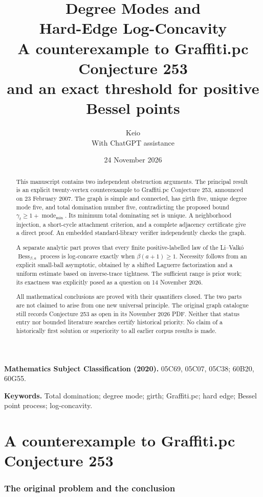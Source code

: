 \documentclass[11pt,a4paper]{article}
\title{\color{ink}\bfseries Degree Modes and\\
Hard-Edge Log-Concavity\\[6pt]
\large A counterexample to Graffiti.pc Conjecture 253\\
and an exact threshold for positive Bessel points}
\author{Keio\\[2pt]\small With ChatGPT assistance}
\date{24 November 2026}
\theoremstyle{definition}
\theoremstyle{remark}
\begin{document}
\maketitle
\thispagestyle{plain}

\begin{abstract}
This manuscript contains two independent obstruction arguments.
The principal result is an explicit twenty-vertex counterexample to
Graffiti.pc Conjecture 253, announced on 23 February 2007. The graph is
simple and connected, has girth five, unique degree mode five, and total
domination number five, contradicting the proposed bound
$\gamma_t\geq1+\operatorname{mode}_{\min}$. Its minimum total dominating
set is unique. A neighborhood injection, a short-cycle attachment
criterion, and a complete adjacency certificate give a direct proof.
An embedded standard-library verifier independently checks the graph.

A separate analytic part proves that every finite positive-labelled
law of the Li--Valk\'o $\operatorname{Bess}_{\beta,a}$ process is
log-concave exactly when $\beta(a+1)\geq1$. Necessity follows from an
explicit small-ball asymptotic, obtained by a shifted Laguerre
factorization and a uniform estimate based on inverse-trace tightness.
The sufficient range is prior work; its exactness was explicitly
posed as a question on 14 November 2026.

All mathematical conclusions are proved with their quantifiers closed.
The two parts are not claimed to arise from one new universal principle.
The original graph catalogue still records Conjecture 253 as open in
its November 2026 PDF. Neither that status entry nor bounded literature
searches certify historical priority. No claim of a historically first
solution or superiority to all earlier corpus results is made.
\end{abstract}

\noindent\textbf{Mathematics Subject Classification (2020).}
05C69, 05C07, 05C38; 60B20, 60G55.

\noindent\textbf{Keywords.}
Total domination; degree mode; girth; Graffiti.pc;
hard edge; Bessel point process; log-concavity.



\clearpage
\tableofcontents
\clearpage
\part{A counterexample to Graffiti.pc Conjecture 253}

\section{The original problem and the conclusion}
\label{sec:problem}
\end{document}
